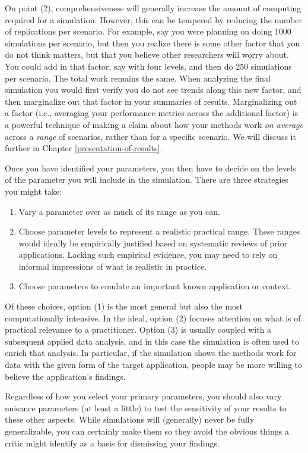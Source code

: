 \documentclass[
]{book}
\providecommand{\tightlist}{%
  \setlength{\itemsep}{0pt}\setlength{\parskip}{0pt}}
\begin{document}
On point (2), comprehensiveness will generally increase the amount of computing required for a simulation. However, this can be tempered by reducing the number of replications per scenario.
For example, say you were planning on doing 1000 simulations per scenario, but then you realize there is some other factor that you do not think matters, but that you believe other researchers will worry about.
You could add in that factor, say with four levels, and then do 250 simulations per scenario.
The total work remains the same.
When analyzing the final simulation you would first verify you do not see trends along this new factor, and then marginalize out that factor in your summaries of results.
Marginalizing out a factor (i.e., averaging your performance metrics across the additional factor) is a powerful technique of making a claim about how your methods work \emph{on average} across a \emph{range} of scenarios, rather than for a specific scenario.
We will discuss it further in Chapter \ref{presentation-of-results}.

Once you have identified your parameters, you then have to decide on the levels of the parameter you will include in the simulation.
There are three strategies you might take:

\begin{enumerate}
\def\labelenumi{\arabic{enumi}.}
\tightlist
\item
  Vary a parameter over as much of its range as you can.
\item
  Choose parameter levels to represent a realistic practical range. These ranges would ideally be empirically justified based on systematic reviews of prior applications. Lacking such empirical evidence, you may need to rely on informal impressions of what is realistic in practice.
\item
  Choose parameters to emulate an important known application or context.
\end{enumerate}

Of these choices, option (1) is the most general but also the most computationally intensive.
In the ideal, option (2) focuses attention on what is of practical relevance to a practitioner.
Option (3) is usually coupled with a subsequent applied data analysis, and in this case the simulation is often used to enrich that analysis.
In particular, if the simulation shows the methods work for data with the given form of the target application, people may be more willing to believe the application's findings.

Regardless of how you select your primary parameters, you should also vary nuisance parameters (at least a little) to test the sensitivity of your results to these other aspects.
While simulations will (generally) never be fully generalizable, you can certainly make them so they avoid the obvious things a critic might identify as a basis for dismissing your findings.
\end{document}
